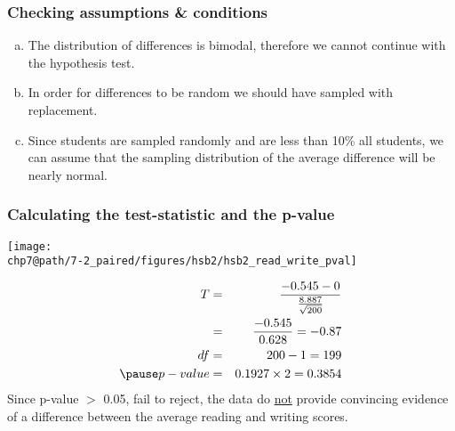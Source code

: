 \documentclass[slidestop,compress,mathserif]{beamer}
\makeatletter
\def\chp7@path{../../Chp 7}
\makeatother
\begin{document}
\begin{frame}
\frametitle{Checking assumptions \& conditions}


\begin{enumerate}[(a)]
\item The distribution of differences is bimodal, therefore we cannot continue with the hypothesis test.
\item In order for differences to be random we should have sampled with replacement.
\item Since students are sampled randomly and are less than 10\% all students, we can assume that the sampling distribution of the average difference will be nearly normal.
\end{enumerate}

\end{frame}



\begin{frame}[shrink]
\frametitle{Calculating the test-statistic and the p-value}


{
\begin{center}
\texttt{[image: \\chp7@path/7-2\_paired/figures/hsb2/hsb2\_read\_write\_pval]}
\end{center}
}
{
\pause
\begin{eqnarray*}
T &=& \frac{-0.545 - 0}{\frac{8.887}{\sqrt{200}}} \\
&=& \frac{-0.545}{0.628} = -0.87 \\
df &=& 200 - 1 = 199 \\
\pause
p-value &=& 0.1927 \times 2 = 0.3854
\end{eqnarray*}
}
\pause 
$\:$ \\
Since p-value $>$ 0.05, fail to reject, the data do \underline{not} provide convincing evidence of a difference between the average reading and writing scores.

\end{frame}
\end{document}
